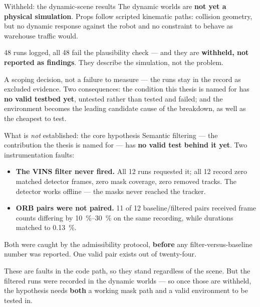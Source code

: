 \documentclass[aspectratio=169,11pt]{beamer}
\begin{document}
\begin{frame}{Withheld: the dynamic-scene results}
  The dynamic worlds are \textbf{not yet a physical simulation}. Props follow
  scripted kinematic paths: collision geometry, but no dynamic response against
  the robot and no constraint to behave as warehouse traffic would.

  \vspace{0.6em}
  \begin{alertblock}{}
    48 runs logged, all 48 fail the plausibility check --- and they are
    \textbf{withheld, not reported as findings}. They describe the simulation,
    not the problem.
  \end{alertblock}

  \vspace{0.6em}
  \raggedright
  A scoping decision, not a failure to measure --- the runs stay in the record as
  excluded evidence. Two consequences: the condition this thesis is named for has
  \textbf{no valid testbed yet}, untested rather than tested and failed; and the
  environment becomes the leading candidate cause of the breakdown, as well as
  the cheapest to test.
\end{frame}

\begin{frame}{What is \emph{not} established: the core hypothesis}
  Semantic filtering --- the contribution the thesis is named for --- has
  \textbf{no valid test behind it yet}. Two instrumentation faults:

  \vspace{1em}
  \begin{itemize}
    \item \textbf{The VINS filter never fired.} All 12 runs requested it; all 12
      record zero matched detector frames, zero mask coverage, zero removed
      tracks. The detector works offline --- the masks never reached the tracker.
    \item \textbf{ORB pairs were not paired.} 11 of 12 baseline/filtered pairs
      received frame counts differing by \SIrange{10}{30}{\percent} on the same
      recording, while durations matched to \SI{0.13}{\percent}.
  \end{itemize}

  \vspace{1em}
  Both were caught by the admissibility protocol, \textbf{before} any
  filter-versus-baseline number was reported. One valid pair exists out of
  twenty-four.

  \vspace{0.6em}
  These are faults in the code path, so they stand regardless of the scene. But
  the filtered runs were recorded in the dynamic worlds --- so once those are
  withheld, the hypothesis needs \textbf{both} a working mask path and a valid
  environment to be tested in.
\end{frame}
\end{document}
